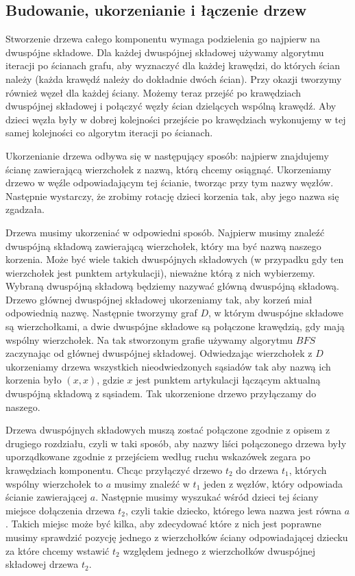 \documentclass[twoside,a4paper,12pt]{report} %
\theoremstyle{break}
\begin{document}
\subsection{Budowanie, ukorzenianie i łączenie drzew} \label{sec.drzewa}
Stworzenie drzewa całego komponentu wymaga podzielenia go najpierw na dwuspójne składowe. Dla każdej dwuspójnej składowej używamy algorytmu iteracji po ścianach grafu, aby wyznaczyć dla każdej krawędzi, do których ścian należy (każda krawędź należy do dokładnie dwóch ścian). Przy okazji tworzymy również węzeł dla każdej ściany. Możemy teraz przejść po krawędziach dwuspójnej składowej i połączyć węzły ścian dzielących wspólną krawędź. Aby dzieci węzła były w dobrej kolejności przejście po krawędziach wykonujemy w tej samej kolejności co algorytm iteracji po ścianach.

Ukorzenianie drzewa odbywa się w następujący sposób: najpierw znajdujemy ścianę zawierającą wierzchołek z nazwą, którą chcemy osiągnąć. Ukorzeniamy drzewo w węźle odpowiadającym tej ścianie, tworząc przy tym nazwy węzłów. Następnie wystarczy, że zrobimy rotację dzieci korzenia tak, aby jego nazwa się zgadzała.

Drzewa musimy ukorzeniać w odpowiedni sposób. Najpierw musimy znaleźć dwuspójną składową zawierającą wierzchołek, który ma być nazwą naszego korzenia. Może być wiele takich dwuspójnych składowych (w przypadku gdy ten wierzchołek jest punktem artykulacji), nieważne którą z nich wybierzemy. Wybraną dwuspójną składową będziemy nazywać główną dwuspójną składową. Drzewo głównej dwuspójnej składowej ukorzeniamy tak, aby korzeń miał odpowiednią nazwę. Następnie tworzymy graf $D$, w którym dwuspójne składowe są wierzchołkami, a dwie dwuspójne składowe są połączone krawędzią, gdy mają wspólny wierzchołek. Na tak stworzonym grafie używamy algorytmu $BFS$ zaczynając od głównej dwuspójnej składowej. Odwiedzając wierzchołek z $D$ ukorzeniamy drzewa wszystkich nieodwiedzonych sąsiadów tak aby nazwą ich korzenia było $(x,x)$, gdzie $x$ jest punktem artykulacji łączącym aktualną dwuspójną składową z sąsiadem. Tak ukorzenione drzewo przyłączamy do naszego.

Drzewa dwuspójnych składowych muszą zostać połączone zgodnie z opisem z drugiego rozdziału, czyli w taki sposób, aby nazwy liści połączonego drzewa były uporządkowane zgodnie z przejściem według ruchu wskazówek zegara po krawędziach komponentu. Chcąc przyłączyć drzewo $t_2$ do drzewa $t_1$, których wspólny wierzchołek to $a$ musimy znaleźć w $t_1$ jeden z węzłów, który odpowiada ścianie zawierającej $a$. Następnie musimy wyszukać wśród dzieci tej ściany miejsce dołączenia drzewa $t_2$, czyli takie dziecko, którego lewa nazwa jest równa $a$. Takich miejsc może być kilka, aby zdecydować które z nich jest poprawne musimy sprawdzić pozycję jednego z wierzchołków ściany odpowiadającej dziecku za które chcemy wstawić $t_2$ względem jednego z wierzchołków dwuspójnej składowej drzewa $t_2$.
\end{document}

